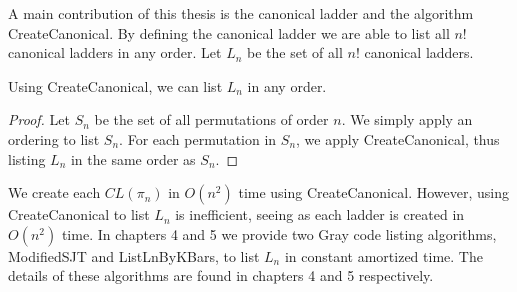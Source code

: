 A main contribution of this thesis is the canonical ladder and the algorithm {\sc CreateCanonical}.
By defining the canonical ladder we are able to list all $n!$ canonical ladders in any order. 
Let $L_{n}$ be the set of all $n!$ canonical ladders. 
\begin{lemma}
    Using {\sc CreateCanonical}, we can list $L_{n}$ in any order.
\end{lemma}
\begin{proof}
 Let $S_{n}$ be the set of all permutations of order $n$. We simply apply an ordering to list $S_{n}$. For each 
 permutation in $S_{n}$, we apply {\sc CreateCanonical}, thus listing $L_{n}$ in the same order as $S_{n}$.
\end{proof}
We create each $CL(\pi_{n})$ in $O(n^2)$ time using {\sc CreateCanonical}. However, using {\sc CreateCanonical} to list $L_{n}$ is inefficient, 
seeing as each ladder is created in $O(n^2)$ time. 
In chapters 4 and 5 we provide two Gray code listing algorithms, {\sc ModifiedSJT} and {\sc ListLnByKBars}, to list $L_{n}$ in constant amortized time. 
The details of these algorithms are found in chapters 4 and 5 respectively.  






